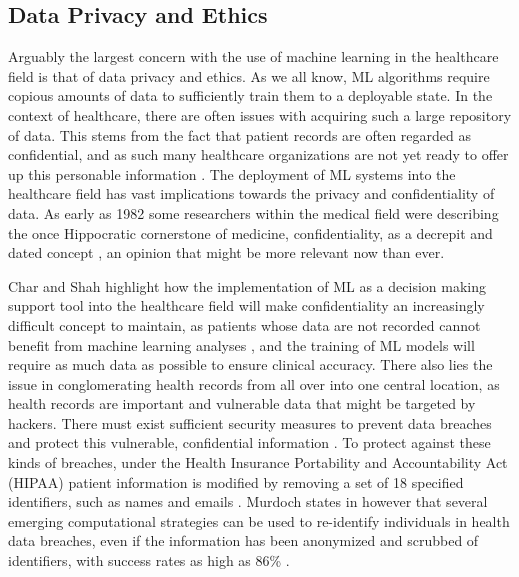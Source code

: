 \documentclass[a4paper]{article}
\begin{document}
\subsection{Data Privacy and Ethics}

Arguably the largest concern with the use of machine learning in the healthcare field is that of data privacy and ethics. As we all know, ML algorithms require copious amounts of data to sufficiently train them to a deployable state. In the context of healthcare, there are often issues with acquiring such a large repository of data. This stems from the fact that patient records are often regarded as confidential, and as such many healthcare organizations are not yet ready to offer up this personable information \cite{Khan_2023}. The deployment of ML systems into the healthcare field has vast implications towards the privacy and confidentiality of data. As early as 1982 some researchers within the medical field were describing the once Hippocratic cornerstone of medicine, confidentiality, as a decrepit and dated concept \cite{Siegler_1982}, an opinion that might be more relevant now than ever.

Char and Shah highlight how the implementation of ML as a decision making support tool into the healthcare field will make confidentiality an increasingly difficult concept to maintain, as patients whose data are not recorded cannot benefit from machine learning analyses \cite{Char_2018}, and the training of ML models will require as much data as possible to ensure clinical accuracy. There also lies the issue in conglomerating health records from all over into one central location, as health records are important and vulnerable data that might be targeted by hackers. There must exist sufficient security measures to prevent data breaches and protect this vulnerable, confidential information \cite{Khan_2023,Ali_2023}. To protect against these kinds of breaches, under the Health Insurance Portability and Accountability Act (HIPAA) patient information is modified by removing a set of 18 specified identifiers, such as names and emails \cite{price_privacy_2019}. Murdoch states in \cite{Murdoch_2021} however that several emerging computational strategies can be used to re-identify individuals in health data breaches, even if the information has been anonymized and scrubbed of identifiers, with success rates as high as 86\% \cite{Murdoch_2021,Check_Hayden_2013,Gymrek_2013,Erlich_2018,Ji_2019}.  
\end{document}
